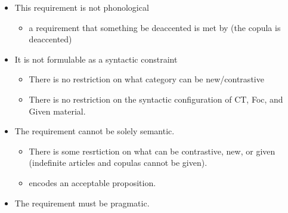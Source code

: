 \documentclass[GPFinal]{subfiles}
\begin{document}
\begin{itemize}
  \item This requirement is not phonological
    \begin{itemize}
      \item a requirement that something be deaccented is met by \Last (the copula is deaccented)
    \end{itemize}
  \item It is not formulable as a syntactic constraint
    \begin{itemize}
      \item There is no restriction on what category can be new/contrastive
      \item There is no restriction on the syntactic configuration of CT, Foc, and Given material.
    \end{itemize}
  \item The requirement cannot be solely semantic.
    \begin{itemize}
      \item There is some resrtiction on what can be contrastive, new, or given (indefinite articles and copulas cannot be given).
      \item \Last encodes an acceptable proposition.
    \end{itemize}
  \item The requirement must be pragmatic.
\end{itemize}
\end{document}
